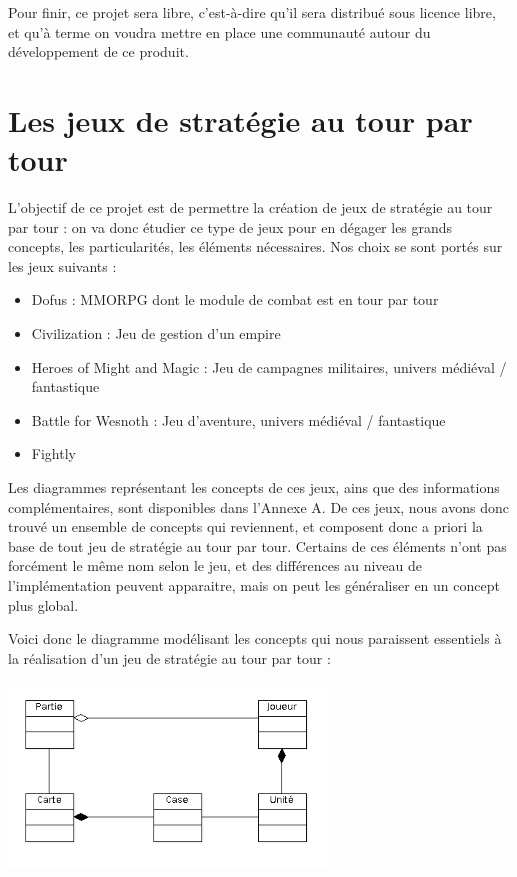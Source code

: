 \documentclass[a4paper,10pt]{report}
\begin{document}
      Pour finir, ce projet sera libre, c'est-à-dire qu'il sera distribué sous licence libre, et qu'à terme on voudra mettre en place une communauté autour du développement de ce produit. 


    \section{Les jeux de stratégie au tour par tour}

      L'objectif de ce projet est de permettre la création de jeux de stratégie au tour par tour : on va donc étudier ce type de jeux pour en dégager les grands concepts, les particularités, les éléments nécessaires. Nos choix se sont portés sur les jeux suivants : 

      \begin{itemize}
        \item Dofus : MMORPG dont le module de combat est en tour par tour
        \item Civilization : Jeu de gestion d'un empire
        \item Heroes of Might and Magic : Jeu de campagnes militaires, univers médiéval / fantastique
        \item Battle for Wesnoth : Jeu d'aventure, univers médiéval / fantastique
        \item Fightly
      \end{itemize}

      Les diagrammes représentant les concepts de ces jeux, ains que des informations complémentaires, sont disponibles dans l'Annexe A. De ces jeux, nous avons donc trouvé un ensemble de concepts qui reviennent, et composent donc a priori la base de tout jeu de stratégie au tour par tour. Certains de ces éléments n'ont pas forcément le même nom selon le jeu, et des différences au niveau de l'implémentation peuvent apparaitre, mais on peut les généraliser en un concept plus global. 

      Voici donc le diagramme modélisant les concepts qui nous paraissent essentiels à la réalisation d'un jeu de stratégie au tour par tour : 
      
      \includegraphics[width=320px]{diagrammes/concept-fightly.png}
\end{document}
